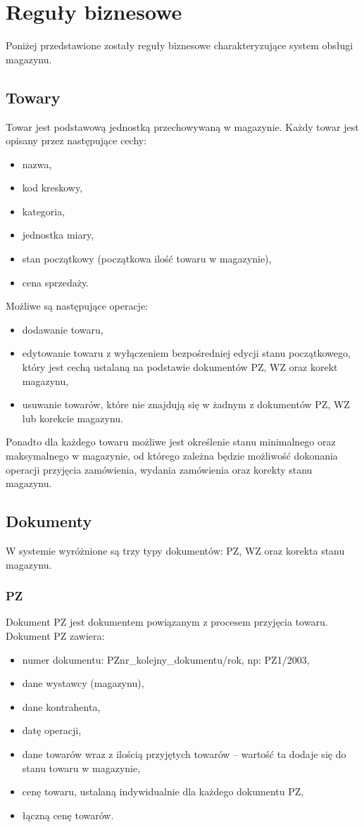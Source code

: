 \section{Reguły biznesowe}
Poniżej przedstawione zostały reguły biznesowe charakteryzujące system obsługi magazynu.

\subsection{Towary}
Towar jest podstawową jednostką przechowywaną w magazynie. Każdy towar jest opisany przez następujące cechy:
\begin{itemize}
	\item nazwa,
	\item kod kreskowy,
	\item kategoria,
	\item jednostka miary,
	\item stan początkowy (początkowa ilość towaru w magazynie),
	\item cena sprzedaży.
\end{itemize}

Możliwe są następujące operacje:
\begin{itemize}
	\item dodawanie towaru,
	\item edytowanie towaru z wyłączeniem bezpośredniej edycji stanu początkowego, który jest cechą ustalaną na podstawie dokumentów PZ, WZ oraz korekt magazynu,
	\item usuwanie towarów, które nie znajdują się w żadnym z dokumentów PZ, WZ lub korekcie magazynu.
\end{itemize}

Ponadto dla każdego towaru możliwe jest określenie stanu minimalnego oraz maksymalnego w magazynie, od którego zależna będzie możliwość dokonania operacji przyjęcia zamówienia, wydania zamówienia oraz korekty stanu magazynu.

\subsection{Dokumenty}
W systemie wyróżnione są trzy typy dokumentów: PZ, WZ oraz korekta stanu magazynu.

\subsubsection{PZ}
Dokument PZ jest dokumentem powiązanym z procesem przyjęcia towaru.
Dokument PZ zawiera:
\begin{itemize}
	\item numer dokumentu: PZnr\_kolejny\_dokumentu/rok, np: PZ1/2003,
	\item dane wystawcy (magazynu),
	\item dane kontrahenta,
	\item datę operacji,
	\item dane towarów wraz z ilością przyjętych towarów -- wartość ta dodaje się do stanu towaru w magazynie,
	\item cenę towaru, ustalaną indywidualnie dla każdego dokumentu PZ,
	\item łączną cenę towarów.
\end{itemize}


